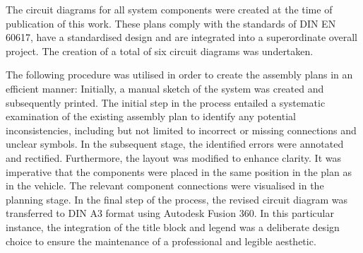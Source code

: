 The circuit diagrams for all system components were created at the time of publication of this work. These plans comply with the standards of DIN EN 60617, have a standardised design and are integrated into a superordinate overall project. The creation of a total of six circuit diagrams was undertaken.

The following procedure was utilised in order to create the assembly plans in an efficient manner:
Initially, a manual sketch of the system was created and subsequently printed. The initial step in the process entailed a systematic examination of the existing assembly plan to identify any potential inconsistencies, including but not limited to incorrect or missing connections and unclear symbols. In the subsequent stage, the identified errors were annotated and rectified. Furthermore, the layout was modified to enhance clarity. It was imperative that the components were placed in the same position in the plan as in the vehicle. The relevant component connections were visualised in the planning stage. In the final step of the process, the revised circuit diagram was transferred to DIN A3 format using Autodesk Fusion 360. In this particular instance, the integration of the title block and legend was a deliberate design choice to ensure the maintenance of a professional and legible aesthetic.

